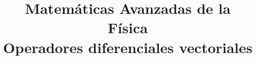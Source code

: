 
\usepackage{tikz-3dplot}
\title{Matemáticas Avanzadas de la Física \\ {\large Operadores diferenciales vectoriales}}
\date{ }

\renewcommand\labelenumii{\theenumi.{\arabic{enumii}}}
\maketitle
\fontsize{14}{14}\selectfont
